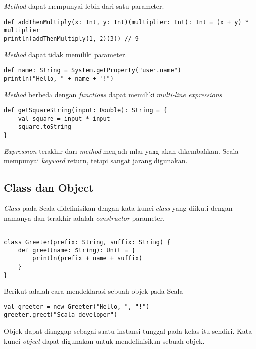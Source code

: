 \textit{Method} dapat mempunyai lebih dari satu parameter. 

\begin{verbatim}
def addThenMultiply(x: Int, y: Int)(multiplier: Int): Int = (x + y) * multiplier 
println(addThenMultiply(1, 2)(3)) // 9 
\end{verbatim}


\textit{Method} dapat tidak memiliki parameter.

\begin{verbatim}
def name: String = System.getProperty("user.name")
println("Hello, " + name + "!")
\end{verbatim}

\textit{Method} berbeda dengan \textit{functions} dapat memiliki \textit{multi-line expressions}

\begin{verbatim}
def getSquareString(input: Double): String = {
    val square = input * input
    square.toString
}
\end{verbatim}

\textit{Expression} terakhir dari \textit{method} menjadi nilai yang akan dikembalikan. Scala mempunyai \textit{keyword} return, tetapi sangat jarang digunakan.

\subsection{Class dan Object}

\textit{Class} pada Scala didefinisikan dengan kata kunci \textit{class} yang diikuti dengan namanya dan terakhir adalah \textit{constructor} parameter.

\begin{verbatim}

class Greeter(prefix: String, suffix: String) {
    def greet(name: String): Unit = {
        println(prefix + name + suffix)
    }
}

\end{verbatim}



Berikut adalah cara mendeklarasi sebuah objek pada Scala
\begin{verbatim}
val greeter = new Greeter("Hello, ", "!")
greeter.greet("Scala developer")
\end{verbatim}

Objek dapat dianggap sebagai suatu instansi tunggal pada kelas itu sendiri. Kata kunci \textit{object} dapat digunakan untuk mendefinisikan sebuah objek.

